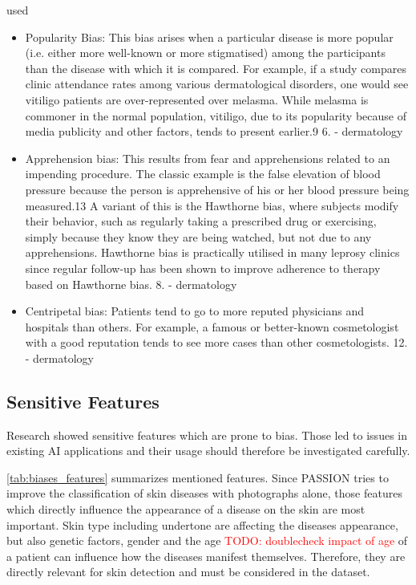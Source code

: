 \documentclass[12pt, a4paper, oneside]{book}   	%
\renewcommand{\todo}[1]{\textcolor{red}{TODO: #1}}
\newif\ifrawcitationactive
\newcommand{\rawcitationstart}{
	\color{purple}\rawcitationactivetrue
}
\newcommand{\rawcitationend}{
	\color{black}\rawcitationactivefalse
}
\newcommand{\rawcitationusedstart}{\color{violet}}
\newcommand{\rawcitationusedend}{%
	\ifrawcitationactive
	\color{purple}  %
	\else
	\color{black}  %
	\fi
}
\begin{document}
			
			\rawcitationstart
			used
			\begin{itemize}		
				\rawcitationusedstart
				\item Popularity Bias: This bias arises when a particular disease is more popular (i.e. either more well-known or more stigmatised) among the participants than the disease with which it is compared. For example, if a study compares clinic attendance rates among various dermatological disorders, one would see vitiligo patients are over-represented over melasma. While melasma is commoner in the normal population, vitiligo, due to its popularity because of media publicity and other factors, tends to present earlier.9 6. \autocite{Chakraborty_2024} - dermatology
				
				\item  Apprehension bias: This results from fear and apprehensions related to an impending procedure. The classic example is the false elevation of blood pressure because the person is apprehensive of his or her blood pressure being measured.13 A variant of this is the Hawthorne bias, where subjects modify their behavior, such as regularly taking a prescribed drug or exercising, simply because they know they are being watched, but not due to any apprehensions. Hawthorne bias is practically utilised in many leprosy clinics since regular follow-up has been shown to improve adherence to therapy based on Hawthorne bias. 8. \autocite{Chakraborty_2024} - dermatology
				
				\item Centripetal bias: Patients tend to go to more reputed physicians and hospitals than others. For example, a famous or better-known cosmetologist with a good reputation tends to see more cases than other cosmetologists. 12.\autocite{Chakraborty_2024}  - dermatology
				\rawcitationusedend
			\end{itemize}
			\rawcitationend
			
			
			\subsection{Sensitive Features}
			Research showed sensitive features which are prone to bias. Those led to issues in existing AI applications and their usage should therefore be investigated carefully.
			
			\autoref{tab:biases_features} summarizes mentioned features. Since PASSION tries to improve the classification of skin diseases with photographs alone, those features which directly influence the appearance of a disease on the skin are most important. Skin type including undertone are affecting the diseases appearance, but also genetic factors, gender and the age \todo{doublecheck impact of age} of a patient can influence how the diseases manifest themselves. Therefore, they are directly relevant for skin detection and must be considered in the dataset.
			
\end{document}
